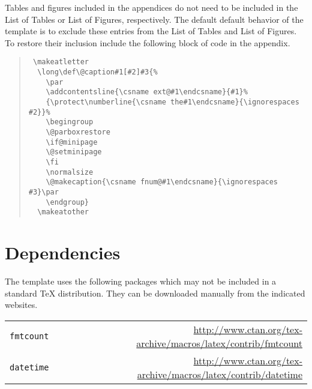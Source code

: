 \documentclass{wmu-thesis}
\begin{document}
 Tables and figures included in the appendices do not need to be included in the List of Tables or List of Figures, respectively.  The default default behavior of the template is to exclude these entries from the List of Tables and List of Figures.  To restore their inclusion %
 include the following block of code in the appendix.
\begin{quote}
\begin{verbatim}
 \makeatletter
  \long\def\@caption#1[#2]#3{%
    \par
    \addcontentsline{\csname ext@#1\endcsname}{#1}%
    {\protect\numberline{\csname the#1\endcsname}{\ignorespaces #2}}%
    \begingroup
    \@parboxrestore
    \if@minipage
    \@setminipage
    \fi
    \normalsize
    \@makecaption{\csname fnum@#1\endcsname}{\ignorespaces #3}\par
    \endgroup}
  \makeatother
\end{verbatim}
\end{quote}
 
\section*{Dependencies}
The template uses the following packages which may not be included in a standard \TeX{} distribution.  They can be downloaded manually from the indicated websites.\\
\begin{center}
\begin{tabular}{lr}
\texttt{fmtcount}& \url{http://www.ctan.org/tex-archive/macros/latex/contrib/fmtcount}\\
\texttt{datetime}& \url{http://www.ctan.org/tex-archive/macros/latex/contrib/datetime}
\end{tabular}
\end{center}
\end{document}
